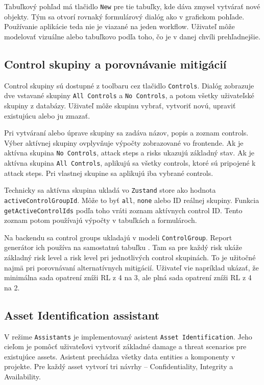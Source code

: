 \documentclass[11pt]{article}
\begin{document}
Tabuľkový pohľad má tlačidlo \texttt{New} pre tie tabuľky, kde dáva zmysel vytvárať nové objekty. Tým sa otvorí rovnaký formulárový dialóg ako v grafickom pohľade. Používanie aplikácie teda nie je viazané na jeden workflow. Uživateľ môže modelovať vizuálne alebo tabuľkovo podľa toho, čo je v danej chvíli prehľadnejšie.

\subsection{Control skupiny a porovnávanie mitigácií}

Control skupiny sú dostupné z toolbaru cez tlačidlo \texttt{Controls}. Dialóg zobrazuje dve vstavané skupiny \texttt{All Controls} a \texttt{No Controls}, a potom všetky uživateľské skupiny z databázy. Uživateľ môže skupinu vybrať, vytvoriť novú, upraviť existujúcu alebo ju zmazať.

Pri vytváraní alebo úprave skupiny sa zadáva názov, popis a zoznam controls. Výber aktívnej skupiny ovplyvňuje výpočty zobrazované vo frontende. Ak je aktívna skupina \texttt{No Controls}, attack steps a risks ukazujú základný stav. Ak je aktívna skupina \texttt{All Controls}, aplikujú sa všetky controls, ktoré sú pripojené k attack steps. Pri vlastnej skupine sa aplikujú iba vybrané controls.

Technicky sa aktívna skupina ukladá vo \texttt{Zustand} store ako hodnota \texttt{activeControlGroupId}. Môže to byť \texttt{all}, \texttt{none} alebo ID reálnej skupiny. Funkcia \texttt{getActiveControlIds} podľa toho vráti zoznam aktívnych control ID. Tento zoznam potom používajú výpočty v tabuľkách a formulároch.

Na backendu sa control groups ukladajú v modeli \texttt{ControlGroup}. Report generátor ich používa na samostatnú tabuľku . Tam sa pre každý risk ukáže základný risk level a risk level pri jednotlivých control skupinách. To je užitočné najmä pri porovnávaní alternatívnych mitigácií. Uživateľ vie napríklad ukázať, že minimálna sada opatrení zníži RL z 4 na 3, ale plná sada opatrení zníži RL z 4 na 2.

\subsection{Asset Identification assistant}

V režime \texttt{Assistants} je implementovaný asistent \texttt{Asset Identification}. Jeho cieľom je pomôcť uživateľovi vytvoriť základné damage a threat scenarios pre existujúce assets. Asistent prechádza všetky data entities a komponenty v projekte. Pre každý asset vytvorí tri návrhy -- Confidentiality, Integrity a Availability.
\end{document}
